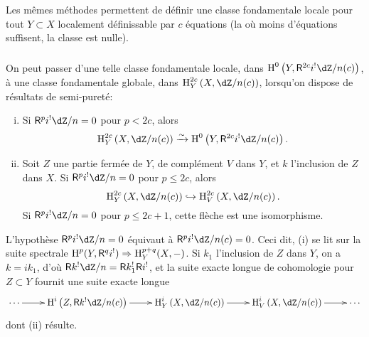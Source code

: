 \subsubsection{}\label{IV:2-2-4}

Les mêmes méthodes permettent de définir une classe fondamentale locale 
pour tout $Y\subset X$ localement définissable par $c$ équations (la où 
moins d'équations suffisent, la classe est nulle). 





\subsubsection{}\label{IV:2-2-5}

On peut passer d'une telle classe fondamentale locale, dans 
$\h^0\left(Y,\R^{2 c} i^!\dZ/n(c)\right)$, à une classe fondamentale globale, 
dans $\h_Y^{2 c}\left(X,\dZ/n(c)\right)$, lorsqu'on dispose de résultats de 
semi-pureté:





\begin{proposition}\label{IV:2-2-6}
\begin{enumerate}[(i)]
  \item Si $\R^p i^!\dZ/n=0$ pour $p<2 c$, alors 
    \[
      \h_Y^{2 c}\left(X,\dZ/n(c)\right) \iso \h^0\left(Y,\R^{2 c} i^! \dZ/n(c)\right) \text{.}
    \]
  \item Soit $Z$ une partie fermée de $Y$, de complément $V$ dans $Y$, et 
    $k$ l'inclusion de $Z$ dans $X$. Si $\R^p i^! \dZ/n = 0$ pour 
    $p\leqslant 2 c$, alors 
    \[
      \h_Y^{2 c}\left(X,\dZ/n(c)\right) \hookrightarrow \h_V^{2 c}\left(X,\dZ/n(c)\right) \text{.}
    \]
    Si $\R^p i^!\dZ/n=0$ pour $p\leqslant 2 c+1$, cette flèche est une 
    isomorphisme.
\end{enumerate}
\end{proposition}

L'hypothèse $\R^p i^!\dZ/n=0$ équivaut à $\R^p i^!\dZ/n(c)=0$. Ceci dit, 
(i) se lit sur la suite spectrale 
$\operatorname{H}^p(Y,\mathsf{R}^q i^!)\Rightarrow \operatorname{H}_Y^{p+q}(X,-)$. Si $k_1$ l'inclusion de $Z$ dans 
$Y$, on a $k=i k_1$, d'où $\R k^! \dZ/n=\R k_1^! \R i^!$, et la suite exacte 
longue de cohomologie pour $Z\subset Y$ fournit une suite exacte longue 
\[\xymatrix{
  \cdots \ar[r] 
    & \h^i\left(Z,\R k^! \dZ/n(c)\right) \ar[r] 
    & \h_Y^i\left(X,\dZ/n(c)\right) \ar[r] 
    & \h_V^i\left(X,\dZ/n(c)\right) \ar[r] 
    & \cdots
}\]
dont (ii) résulte. 






